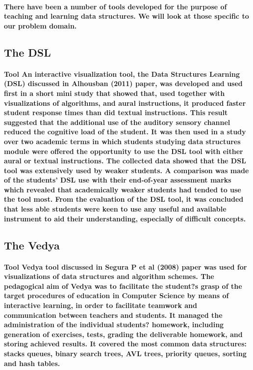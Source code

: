 \documentclass{article}
\begin{document}
\paragraph{There have been a number of tools developed for the purpose of teaching and learning data structures. We will look at those specific to our problem domain.}
\subsection{The DSL }
\paragraph{Tool An interactive visualization tool, the Data Structures Learning (DSL) discussed in Alhousban (2011) paper\cite{kumar2017conceptualization}, was developed and used first in a short mini study that showed that, used together with visualizations of algorithms, and aural instructions, it produced faster student response times than did textual instructions. This result suggested that the additional use of the auditory sensory channel reduced the cognitive load of the student. It was then used in a study over two academic terms in which students studying data structures module were offered the opportunity to use the DSL tool with either aural or textual instructions. The collected data showed that the DSL tool was extensively used by weaker students. A comparison was made of the students' DSL use with their end-of-year assessment marks which revealed that academically weaker students had tended to use the tool most. From the evaluation of the DSL tool, it was concluded that less able students were keen to use any useful and available instrument to aid their understanding, especially of difficult concepts.}
\subsection{The Vedya}
\paragraph{Tool Vedya tool discussed in Segura P et al (2008) paper was used for visualizations of data structures and algorithm schemes. \cite{patel2014literature}The pedagogical aim of Vedya was to facilitate the student?s grasp of the target procedures of education in Computer Science by means of interactive learning, in order to facilitate teamwork and communication between teachers and students. It managed the administration of the individual students? homework, including generation of exercises, tests, grading the deliverable homework, and storing achieved results. It covered the most common data structures: stacks queues, binary search trees, AVL trees, priority queues, sorting and hash tables. }
\end{document}
